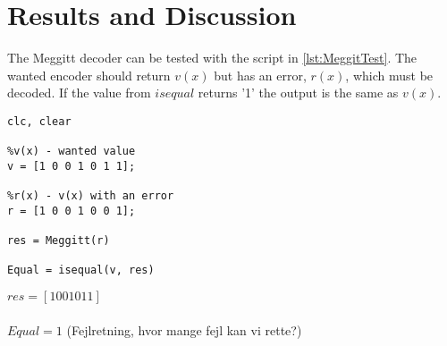 \documentclass[Main]{subfiles}
\begin{document}
\section{Results and Discussion}


The Meggitt decoder can be tested with the script in \codeTitle \ref{lst:MeggitTest}.
The wanted encoder should return $v(x)$ but has an error, $r(x)$, which must be decoded.
If the value from $isequal$ returns '1' the output is the same as $v(x)$.

\begin{lstlisting}[caption=Meggitt test script, style=Code-Matlab, label=lst:MeggitTest]
%Meggitt decoder
clc, clear

%v(x) - wanted value
v = [1 0 0 1 0 1 1];

%r(x) - v(x) with an error
r = [1 0 0 1 0 0 1];

res = Meggitt(r)

Equal = isequal(v, res)
\end{lstlisting}

$res = [1 0 0 1 0 1 1]$
\\
\\
$Equal = 1 $
(Fejlretning, hvor mange fejl kan vi rette?)
\end{document}
